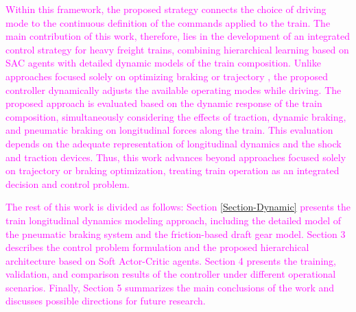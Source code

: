 \documentclass[preprint,10pt]{elsarticle}
\begin{document}
\textcolor{Magenta}{Within this framework, the proposed strategy connects the choice of driving mode to the continuous definition of the commands applied to the train. The main contribution of this work, therefore, lies in the development of an integrated control strategy for heavy freight trains, combining hierarchical learning based on SAC agents with detailed dynamic models of the train composition. Unlike approaches focused solely on optimizing braking or trajectory \citep{bai2020multi,eckert2025multi}, the proposed controller dynamically adjusts the available operating modes while driving. The proposed approach is evaluated based on the dynamic response of the train composition, simultaneously considering the effects of traction, dynamic braking, and pneumatic braking on longitudinal forces along the train. This evaluation depends on the adequate representation of longitudinal dynamics and the shock and traction devices. Thus, this work advances beyond approaches focused solely on trajectory or braking optimization, treating train operation as an integrated decision and control problem.}

\textcolor{Magenta}{The rest of this work is divided as follows: Section \ref{Section-Dynamic} presents the train longitudinal dynamics modeling approach, including the detailed model of the pneumatic braking system and the friction-based draft gear model. Section 3 describes the control problem formulation and the proposed hierarchical architecture based on Soft Actor-Critic agents. Section 4 presents the training, validation, and comparison results of the controller under different operational scenarios. Finally, Section 5 summarizes the main conclusions of the work and discusses possible directions for future research.}
\end{document}
